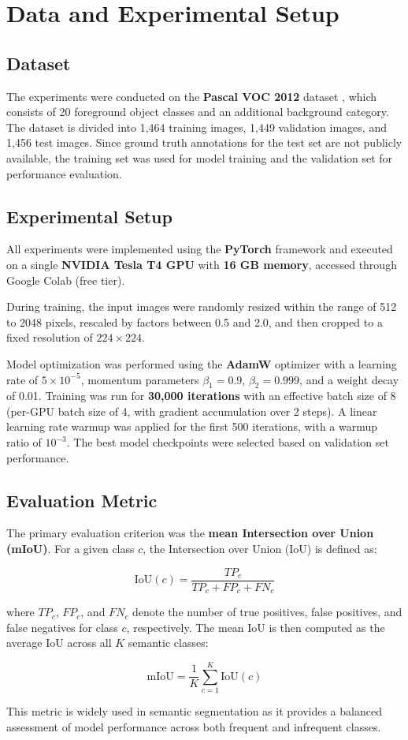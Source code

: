 \section{Data and Experimental Setup}
\label{sec:data_and_experimental_setup}

\subsection{Dataset}
\label{subsec:dataset}
The experiments were conducted on the \textbf{Pascal VOC 2012} dataset \cite{dataset_pascal_voc}, which consists of 20 foreground object classes and an additional background category. The dataset is divided into 1,464 training images, 1,449 validation images, and 1,456 test images. Since ground truth annotations for the test set are not publicly available, the training set was used for model training and the validation set for performance evaluation.

\subsection{Experimental Setup}
\label{subsec:experimental_setup}
All experiments were implemented using the \textbf{PyTorch} framework and executed on a single \textbf{NVIDIA Tesla T4 GPU} with \textbf{16 GB memory}, accessed through Google Colab (free tier).

During training, the input images were randomly resized within the range of 512 to 2048 pixels, rescaled by factors between 0.5 and 2.0, and then cropped to a fixed resolution of $224 \times 224$.

Model optimization was performed using the \textbf{AdamW} optimizer with a learning rate of $5 \times 10^{-5}$, momentum parameters $\beta_1 = 0.9$, $\beta_2 = 0.999$, and a weight decay of 0.01. Training was run for \textbf{30,000 iterations} with an effective batch size of 8 (per-GPU batch size of 4, with gradient accumulation over 2 steps). A linear learning rate warmup was applied for the first 500 iterations, with a warmup ratio of $10^{-3}$. The best model checkpoints were selected based on validation set performance.

\subsection{Evaluation Metric}
\label{subsec:evaluation_metric}
The primary evaluation criterion was the \textbf{mean Intersection over Union (mIoU)}. For a given class $c$, the Intersection over Union (IoU) is defined as:

$$
\text{IoU}(c) = \frac{TP_c}{TP_c + FP_c + FN_c}
$$

where $TP_c$, $FP_c$, and $FN_c$ denote the number of true positives, false positives, and false negatives for class $c$, respectively. The mean IoU is then computed as the average IoU across all $K$ semantic classes:

$$
\text{mIoU} = \frac{1}{K} \sum_{c=1}^{K} \text{IoU}(c)
$$

This metric is widely used in semantic segmentation as it provides a balanced assessment of model performance across both frequent and infrequent classes.
